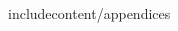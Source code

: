 \documentclass[12pt,a4paper,twoside,openright]{report}
\begin{document}
\begin{spacing}{1.2}
\listoffigures{}





include{content/appendices}

\end{spacing}
\end{document}
